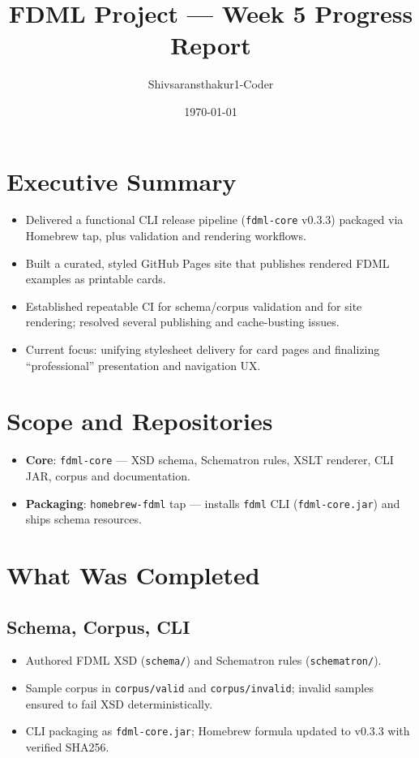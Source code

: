 \documentclass[11pt,a4paper]{article}
\title{\textbf{FDML Project — Week 5 Progress Report}}
\author{Shivsaransthakur1-Coder}
\date{\today}
\begin{document}
\maketitle

\section{Executive Summary}
\begin{itemize}[leftmargin=1.2em]
  \item Delivered a functional CLI release pipeline (\texttt{fdml-core} v0.3.3) packaged via Homebrew tap, plus validation and rendering workflows.
  \item Built a curated, styled GitHub Pages site that publishes rendered FDML examples as printable cards.
  \item Established repeatable CI for schema/corpus validation and for site rendering; resolved several publishing and cache-busting issues.
  \item Current focus: unifying stylesheet delivery for card pages and finalizing “professional” presentation and navigation UX.
\end{itemize}

\section{Scope and Repositories}
\begin{itemize}[leftmargin=1.2em]
  \item \textbf{Core}: \texttt{fdml-core} — XSD schema, Schematron rules, XSLT renderer, CLI JAR, corpus and documentation.
  \item \textbf{Packaging}: \texttt{homebrew-fdml} tap — installs \texttt{fdml} CLI (\texttt{fdml-core.jar}) and ships schema resources.
\end{itemize}

\section{What Was Completed}
\subsection{Schema, Corpus, CLI}
\begin{itemize}[leftmargin=1.2em]
  \item Authored FDML XSD (\texttt{schema/}) and Schematron rules (\texttt{schematron/}).
  \item Sample corpus in \texttt{corpus/valid} and \texttt{corpus/invalid}; invalid samples ensured to fail XSD deterministically.
  \item CLI packaging as \texttt{fdml-core.jar}; Homebrew formula updated to v0.3.3 with verified SHA256.
\end{itemize}
\end{document}
